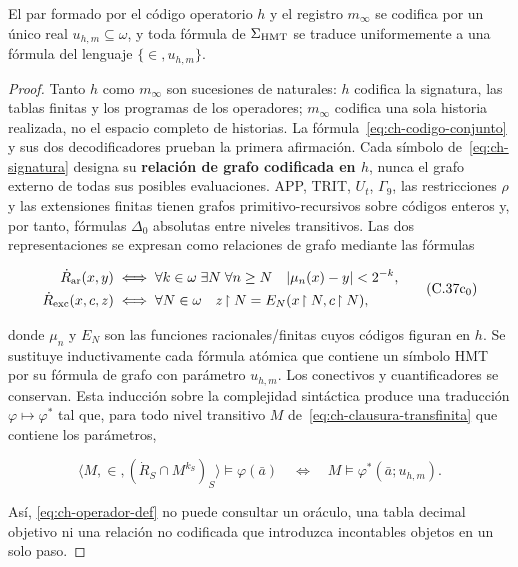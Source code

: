 \begin{lemma}
\label{thm:ch-6}
El par formado por
el código operatorio \(h\) y el registro \(m_\infty\) se codifica por un único
real \(u_{h,m}\subseteq\omega\), y toda fórmula de \(\Sigma_{\rm HMT}\) se
traduce uniformemente a una fórmula del lenguaje \(\{\in,u_{h,m}\}\).

\end{lemma}
\begin{proof}
Tanto \(h\) como \(m_\infty\) son sucesiones de naturales: \(h\)
codifica la signatura, las tablas finitas y los programas de los operadores;
\(m_\infty\) codifica una sola historia realizada, no el espacio completo de
historias. La fórmula~\eqref{eq:ch-codigo-conjunto} y sus dos decodificadores prueban la primera
afirmación. Cada símbolo de~\eqref{eq:ch-signatura} designa su \textbf{relación de grafo codificada en \(h\)}, nunca el grafo externo de todas sus posibles evaluaciones. APP,
TRIT, \(U_t\), \(\Gamma_9\), las restricciones \(\rho\) y las extensiones
finitas tienen grafos primitivo-recursivos sobre códigos enteros y, por tanto,
fórmulas \(\Delta_0\) absolutas entre niveles transitivos. Las dos
representaciones se expresan como relaciones de grafo mediante las fórmulas

\[
 \begin{aligned}
 \dot R_{\rm ar}(x,y)
 &\;\Longleftrightarrow\;
 \forall k\in\omega\;\exists N\;\forall n\ge N\quad
 |\mu_n(x)-y|<2^{-k},\\
 \dot R_{\rm exc}(x,c,z)
 &\;\Longleftrightarrow\;
 \forall N\in\omega\quad z\!\upharpoonright N
   =E_N(x\!\upharpoonright N,c\!\upharpoonright N),
 \end{aligned}
\tag{C.37c$_0$}\label{eq:ch-grafos-publicacion}
\]

donde \(\mu_n\) y \(E_N\) son las funciones racionales/finitas cuyos códigos
figuran en \(h\). Se sustituye inductivamente cada fórmula atómica que contiene
un símbolo HMT por su fórmula de grafo con parámetro \(u_{h,m}\). Los
conectivos y cuantificadores se conservan. Esta inducción sobre la complejidad
sintáctica produce una traducción \(\varphi\mapsto\varphi^*\) tal que, para
todo nivel transitivo \(M\) de~\eqref{eq:ch-clausura-transfinita} que contiene los parámetros,

\[
 \langle M,\in,(\dot R_S\cap M^{k_S})_S\rangle
   \models\varphi(\bar a)
 \quad\Longleftrightarrow\quad
 M\models\varphi^*(\bar a;u_{h,m}).
\tag{C.37c}\label{eq:ch-eliminacion-uniforme}
\]

Así, \eqref{eq:ch-operador-def} no puede consultar un oráculo, una tabla decimal objetivo ni una
relación no codificada que introduzca incontables objetos en un solo paso.
\end{proof}

